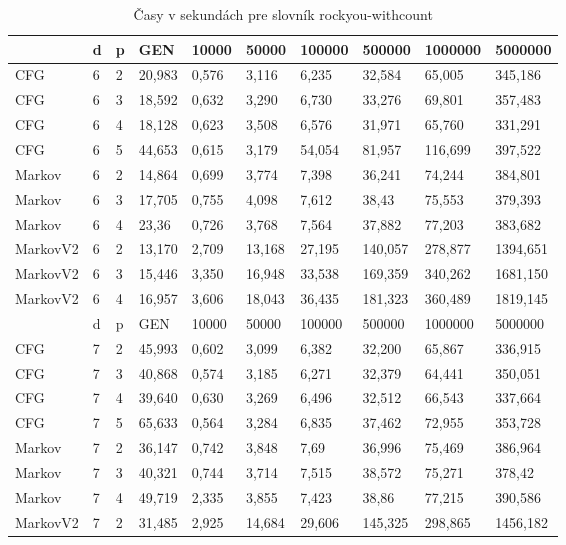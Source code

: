 \begin{table}[]
\centering
\caption{Časy v sekundách pre slovník rockyou-withcount}
\label{tbl:rockyouTime}
\begin{tabular}{lll|lllllll}
       & d & p & GEN     & 10000  & 50000  & 100000 & 500000 & 1000000 & 5000000 \\ \hline
CFG    & 6 & 2 & 20,983   & 0,576  & 3,116  & 6,235  & 32,584 & 65,005  & 345,186 \\
CFG    & 6 & 3 & 18,592    & 0,632  & 3,290  & 6,730  & 33,276 & 69,801  & 357,483 \\
CFG    & 6 & 4 & 18,128   & 0,623  & 3,508   & 6,576   & 31,971 & 65,760  & 331,291 \\
CFG    & 6 & 5 & 44,653 & 0,615 & 3,179 & 54,054 & 81,957 & 116,699 & 397,522 \\
Markov & 6 & 2 & 14,864 & 0,699 & 3,774 & 7,398 & 36,241 & 74,244 & 384,801 \\
Markov & 6 & 3 & 17,705 & 0,755 & 4,098 & 7,612 & 38,43  & 75,553 & 379,393 \\
Markov & 6 & 4 & 23,36  & 0,726 & 3,768 & 7,564 & 37,882 & 77,203 & 383,682 \\
MarkovV2 & 6 & 2 & 13,170     & 2,709  & 13,168  & 27,195  & 140,057 & 278,877  & 1394,651 \\
MarkovV2 & 6 & 3 & 15,446     & 3,350  & 16,948  & 33,538  & 169,359 & 340,262  & 1681,150 \\
MarkovV2 & 6 & 4 & 16,957     & 3,606  & 18,043  & 36,435 & 181,323 & 360,489  & 1819,145 \\ \hline
       & d & p & GEN     & 10000  & 50000  & 100000 & 500000 & 1000000 & 5000000 \\ \hline
CFG    & 7 & 2 & 45,993    & 0,602  & 3,099  & 6,382  & 32,200  & 65,867  & 336,915 \\
CFG    & 7 & 3 & 40,868   & 0,574   & 3,185  & 6,271  & 32,379 & 64,441  & 350,051 \\
CFG    & 7 & 4 & 39,640   & 0,630  & 3,269  & 6,496  & 32,512 & 66,543  & 337,664 \\
CFG    & 7 & 5 & 65,633 & 0,564 & 3,284 & 6,835 & 37,462  & 72,955 & 353,728 \\
Markov & 7 & 2 & 36,147 & 0,742 & 3,848 & 7,69  & 36,996 & 75,469 & 386,964 \\
Markov & 7 & 3 & 40,321 & 0,744 & 3,714 & 7,515 & 38,572 & 75,271 & 378,42  \\
Markov & 7 & 4 & 49,719 & 2,335 & 3,855 & 7,423 & 38,86  & 77,215 & 390,586 \\
MarkovV2 & 7 & 2 & 31,485  & 2,925  & 14,684  & 29,606  & 145,325  & 298,865  & 1456,182 \\

\end{tabular}
\end{table}
